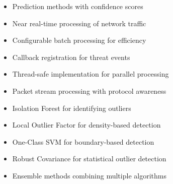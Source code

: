 \documentclass[12pt]{article}
\begin{document}
\begin{itemize}
\item Prediction methods with confidence scores
\end{itemize}

\begin{itemize}
\item Near real-time processing of network traffic
\end{itemize}

\begin{itemize}
\item Configurable batch processing for efficiency
\end{itemize}

\begin{itemize}
\item Callback registration for threat events
\end{itemize}

\begin{itemize}
\item Thread-safe implementation for parallel processing
\end{itemize}

\begin{itemize}
\item Packet stream processing with protocol awareness
\end{itemize}

\begin{itemize}
\item Isolation Forest for identifying outliers
\end{itemize}

\begin{itemize}
\item Local Outlier Factor for density-based detection
\end{itemize}

\begin{itemize}
\item One-Class SVM for boundary-based detection
\end{itemize}

\begin{itemize}
\item Robust Covariance for statistical outlier detection
\end{itemize}

\begin{itemize}
\item Ensemble methods combining multiple algorithms
\end{itemize}
\end{document}
